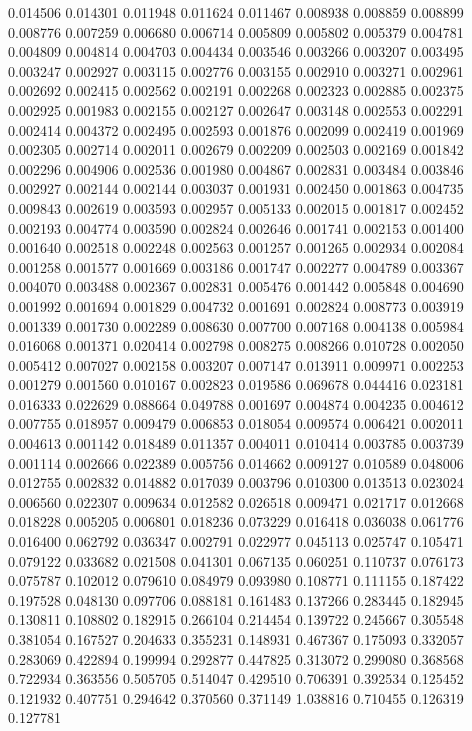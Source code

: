 0.014506
0.014301
0.011948
0.011624
0.011467
0.008938
0.008859
0.008899
0.008776
0.007259
0.006680
0.006714
0.005809
0.005802
0.005379
0.004781
0.004809
0.004814
0.004703
0.004434
0.003546
0.003266
0.003207
0.003495
0.003247
0.002927
0.003115
0.002776
0.003155
0.002910
0.003271
0.002961
0.002692
0.002415
0.002562
0.002191
0.002268
0.002323
0.002885
0.002375
0.002925
0.001983
0.002155
0.002127
0.002647
0.003148
0.002553
0.002291
0.002414
0.004372
0.002495
0.002593
0.001876
0.002099
0.002419
0.001969
0.002305
0.002714
0.002011
0.002679
0.002209
0.002503
0.002169
0.001842
0.002296
0.004906
0.002536
0.001980
0.004867
0.002831
0.003484
0.003846
0.002927
0.002144
0.002144
0.003037
0.001931
0.002450
0.001863
0.004735
0.009843
0.002619
0.003593
0.002957
0.005133
0.002015
0.001817
0.002452
0.002193
0.004774
0.003590
0.002824
0.002646
0.001741
0.002153
0.001400
0.001640
0.002518
0.002248
0.002563
0.001257
0.001265
0.002934
0.002084
0.001258
0.001577
0.001669
0.003186
0.001747
0.002277
0.004789
0.003367
0.004070
0.003488
0.002367
0.002831
0.005476
0.001442
0.005848
0.004690
0.001992
0.001694
0.001829
0.004732
0.001691
0.002824
0.008773
0.003919
0.001339
0.001730
0.002289
0.008630
0.007700
0.007168
0.004138
0.005984
0.016068
0.001371
0.020414
0.002798
0.008275
0.008266
0.010728
0.002050
0.005412
0.007027
0.002158
0.003207
0.007147
0.013911
0.009971
0.002253
0.001279
0.001560
0.010167
0.002823
0.019586
0.069678
0.044416
0.023181
0.016333
0.022629
0.088664
0.049788
0.001697
0.004874
0.004235
0.004612
0.007755
0.018957
0.009479
0.006853
0.018054
0.009574
0.006421
0.002011
0.004613
0.001142
0.018489
0.011357
0.004011
0.010414
0.003785
0.003739
0.001114
0.002666
0.022389
0.005756
0.014662
0.009127
0.010589
0.048006
0.012755
0.002832
0.014882
0.017039
0.003796
0.010300
0.013513
0.023024
0.006560
0.022307
0.009634
0.012582
0.026518
0.009471
0.021717
0.012668
0.018228
0.005205
0.006801
0.018236
0.073229
0.016418
0.036038
0.061776
0.016400
0.062792
0.036347
0.002791
0.022977
0.045113
0.025747
0.105471
0.079122
0.033682
0.021508
0.041301
0.067135
0.060251
0.110737
0.076173
0.075787
0.102012
0.079610
0.084979
0.093980
0.108771
0.111155
0.187422
0.197528
0.048130
0.097706
0.088181
0.161483
0.137266
0.283445
0.182945
0.130811
0.108802
0.182915
0.266104
0.214454
0.139722
0.245667
0.305548
0.381054
0.167527
0.204633
0.355231
0.148931
0.467367
0.175093
0.332057
0.283069
0.422894
0.199994
0.292877
0.447825
0.313072
0.299080
0.368568
0.722934
0.363556
0.505705
0.514047
0.429510
0.706391
0.392534
0.125452
0.121932
0.407751
0.294642
0.370560
0.371149
1.038816
0.710455
0.126319
0.127781

